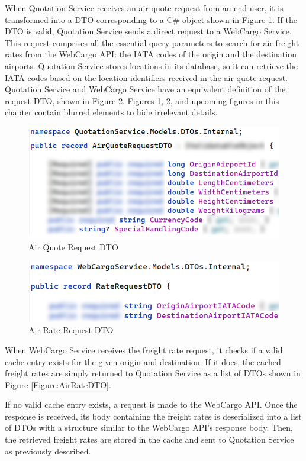 \documentclass[12pt, reqno]{amsbook}
\theoremstyle{definition}
\theoremstyle{definition}
\numberwithin{section}{chapter}
\numberwithin{table}{chapter}
\numberwithin{figure}{chapter}
\begin{document}
When Quotation Service receives an air quote request from an end user, it is transformed into a \ac{DTO} corresponding to a C\# object shown in Figure \ref{Figure:AirQuoteRequestDTO}. If the \ac{DTO} is valid, Quotation Service sends a direct request to a WebCargo Service. This request comprises all the essential query parameters to search for air freight rates from the WebCargo \ac{API}: the \ac{IATA} codes of the origin and the destination airports. Quotation Service stores locations in its database, so it can retrieve the \ac{IATA} codes based on the location identifiers received in the air quote request. Quotation Service and WebCargo Service have an equivalent definition of the request \ac{DTO}, shown in Figure \ref{Figure:AirRateRequestDTO}. Figures \ref{Figure:AirQuoteRequestDTO}, \ref{Figure:AirRateRequestDTO}, and upcoming figures in this chapter contain blurred elements to hide irrelevant details.

\begin{figure}[H]
  \centering
  \includegraphics[width=0.7\linewidth]{images/AirQuoteRequestDTO.png}
  \caption{\label{Figure:AirQuoteRequestDTO}Air Quote Request DTO}
\end{figure}

\begin{figure}[H]
  \centering
  \includegraphics[width=0.7\linewidth]{images/AirRateRequestDTO.png}
  \caption{\label{Figure:AirRateRequestDTO}Air Rate Request DTO}
\end{figure}

When WebCargo Service receives the freight rate request, it checks if a valid cache entry exists for the given origin and destination. If it does, the cached freight rates are simply returned to Quotation Service as a list of \acp{DTO} shown in Figure \ref{Figure:AirRateDTO}.

If no valid cache entry exists, a request is made to the WebCargo \ac{API}. Once the response is received, its body containing the freight rates is deserialized into a list of \acp{DTO} with a structure similar to the WebCargo \ac{API}'s response body. Then, the retrieved freight rates are stored in the cache and sent to Quotation Service as previously described.
\end{document}

